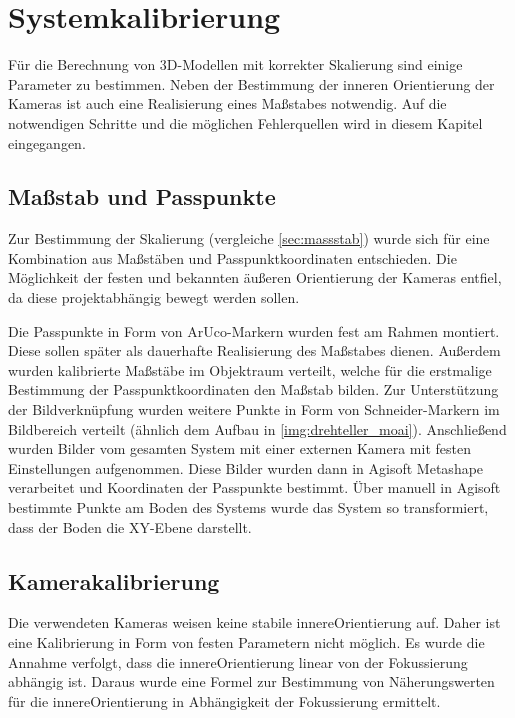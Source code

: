 \documentclass[./00PhotoBox.tex]{subfiles}
\begin{document}
\chapter{Systemkalibrierung}

Für die Berechnung von 3D-Modellen mit korrekter Skalierung sind einige Parameter zu bestimmen. Neben der Bestimmung der inneren Orientierung der Kameras ist auch eine Realisierung eines Maßstabes notwendig. Auf die notwendigen Schritte und die möglichen Fehlerquellen wird in diesem Kapitel eingegangen.

\section{Maßstab und Passpunkte}
\label{sec:passpunkt_bestimmung}
Zur Bestimmung der Skalierung (vergleiche \autoref{sec:massstab}) wurde sich für eine Kombination aus Maß\-stäben und Passpunktkoordinaten entschieden. Die Möglichkeit der festen und bekannten äußeren Orientierung der Kameras entfiel, da diese projektabhängig bewegt werden sollen.

Die Passpunkte in Form von ArUco-Markern wurden fest am Rahmen montiert. Diese sollen später als dauerhafte Realisierung des Maßstabes dienen. Außerdem wurden kalibrierte Maßstäbe im Objektraum verteilt, welche für die erstmalige Bestimmung der Passpunktkoordinaten den Maßstab bilden. Zur Unterstützung der Bildverknüpfung wurden weitere Punkte in Form von Schneider-Markern im Bildbereich verteilt (ähnlich dem Aufbau in \autoref{img:drehteller_moai}). Anschließend wurden Bilder vom gesamten System mit  einer externen Kamera mit festen Einstellungen aufgenommen. Diese Bilder wurden dann in Agisoft Metashape verarbeitet und Koordinaten der Passpunkte bestimmt. Über manuell in Agisoft bestimmte Punkte am Boden des Systems wurde das System so transformiert, dass der Boden die XY-Ebene darstellt.

\section{Kamerakalibrierung}
Die verwendeten Kameras weisen keine stabile \gls{innereOrientierung} auf. Daher ist eine Kalibrierung in Form von festen Parametern nicht möglich. Es wurde die Annahme verfolgt, dass die \gls{innereOrientierung} linear von der Fokussierung abhängig ist. Daraus wurde eine Formel zur Bestimmung von Näherungswerten für die \gls{innereOrientierung} in Abhängigkeit der Fokussierung ermittelt.
\end{document}
